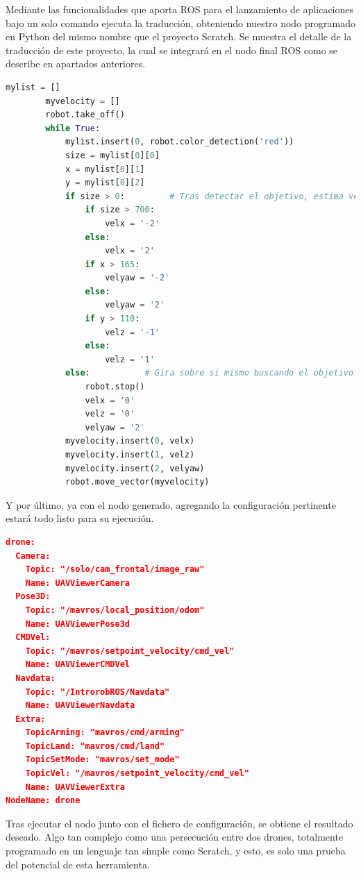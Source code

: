 Mediante las funcionalidades que aporta ROS para el lanzamiento de aplicaciones bajo un solo comando ejecuta la traducción, obteniendo nuestro nodo programado en Python del mismo nombre que el proyecto Scratch. Se muestra el detalle de la traducción de este proyecto, la cual se integrará en el nodo final ROS como se describe en apartados anteriores.

\begin{lstlisting}[language=python,firstnumber=1]
 		mylist = [] 
 		myvelocity = []
        robot.take_off()
        while True:
            mylist.insert(0, robot.color_detection('red'))
            size = mylist[0][0]
            x = mylist[0][1]
            y = mylist[0][2]
            if size > 0: 		 # Tras detectar el objetivo, estima velocidades
                if size > 700:
                    velx = '-2'
                else:
                    velx = '2'
                if x > 165:
                    velyaw = '-2'
                else:
                    velyaw = '2'               
                if y > 110:
                    velz = '-1'
                else:
                    velz = '1'               
            else:			# Gira sobre si mismo buscando el objetivo
                robot.stop()
                velx = '0'
                velz = '0'
                velyaw = '2'            
            myvelocity.insert(0, velx)
            myvelocity.insert(1, velz)
            myvelocity.insert(2, velyaw)
            robot.move_vector(myvelocity)
\end{lstlisting}

Y por último, ya con el nodo generado, agregando la configuración pertinente estará todo listo para su ejecución.

\begin{lstlisting}[language=json,firstnumber=1]
drone:
  Camera:
    Topic: "/solo/cam_frontal/image_raw"
    Name: UAVViewerCamera    
  Pose3D:
    Topic: "/mavros/local_position/odom"
    Name: UAVViewerPose3d
  CMDVel:
    Topic: "/mavros/setpoint_velocity/cmd_vel"
    Name: UAVViewerCMDVel    
  Navdata:
    Topic: "/IntrorobROS/Navdata"
    Name: UAVViewerNavdata 
  Extra:
    TopicArming: "mavros/cmd/arming"
    TopicLand: "mavros/cmd/land"
    TopicSetMode: "mavros/set_mode"
    TopicVel: "/mavros/setpoint_velocity/cmd_vel"
    Name: UAVViewerExtra
NodeName: drone
\end{lstlisting}
Tras ejecutar el nodo junto con el fichero de configuración, se obtiene el resultado deseado. Algo tan complejo como una persecución entre dos drones, totalmente programado en un lenguaje tan simple como Scratch, y esto, es solo una prueba del potencial de esta herramienta.\\

